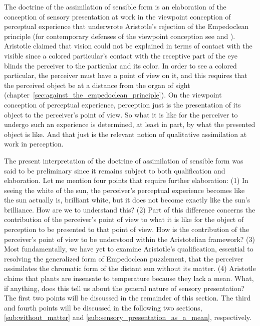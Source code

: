 The doctrine of the assimilation of sensible form is an elaboration of the conception of sensory presentation at work in the viewpoint conception of perceptual experience that underwrote Aristotle's rejection of the Empedoclean principle (for contemporary defenses of the viewpoint conception see \citealt{Martin:1998nx} and \citealt{Kalderon:2011fk}). Aristotle claimed that vision could not be explained in terms of contact with the visible since a colored particular's contact with the receptive part of the eye blinds the perceiver to the particular and its color. In order to see a colored particular, the perceiver must have a point of view on it, and this requires that the perceived object be at a distance from the organ of sight (chapter~\ref{sec:against_the_empedoclean_principle}). On the viewpoint conception of perceptual experience, perception just is the presentation of its object to the perceiver's point of view. So what it is like for the perceiver to undergo such an experience is determined, at least in part, by what the presented object is like. And that just is the relevant notion of qualitative assimilation at work in perception.

The present interpretation of the doctrine of assimilation of sensible form was said to be preliminary since it remains subject to both qualification and elaboration. Let me mention four points that require further elaboration: (1) In seeing the white of the sun, the perceiver's perceptual experience becomes like the sun actually is, brilliant white, but it does not become exactly like the sun's brilliance. How are we to understand this? (2) Part of this difference concerns the contribution of the perceiver's point of view to what it is like for the object of perception to be presented to that point of view. How is the contribution of the perceiver's point of view to be understood within the Aristotelian framework? (3) Most fundamentally, we have yet to examine Aristotle's qualification, essential to resolving the generalized form of Empedoclean puzzlement, that the perceiver assimilates the chromatic form of the distant sun without its matter. (4) Aristotle claims that plants are insensate to temperature because they lack a mean. What, if anything, does this tell us about the general nature of sensory presentation? The first two points will be discussed in the remainder of this section. The third and fourth points will be discussed in the following two sections, \ref{sub:without_matter} and \ref{sub:sensory_presentation_as_a_mean}, respectively.

